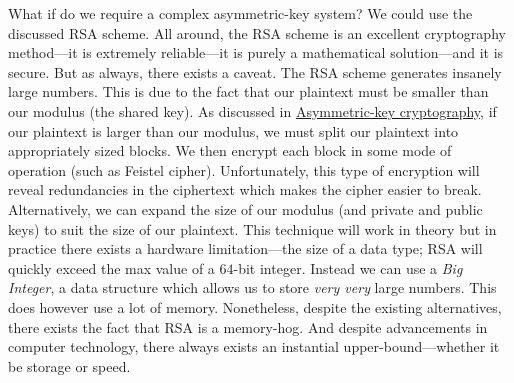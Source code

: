 What if do we require a complex asymmetric-key system? We could use the discussed RSA scheme. All around, the RSA
scheme is an excellent cryptography method---it is extremely reliable---it is purely a mathematical solution---and it is secure. 
But as always, there exists a caveat. The RSA scheme generates insanely large numbers. This is due to the fact that our plaintext
must be smaller than our modulus (the shared key). As discussed in 
\hyperref[Asymmetric-key cryptography]{Asymmetric-key cryptography}, if our plaintext is
larger than our modulus, we must split our plaintext into appropriately sized blocks. We then encrypt each block in some mode
of operation (such as Feistel cipher). Unfortunately, this type of encryption will reveal redundancies in the ciphertext which
makes the cipher easier to break. Alternatively, we can expand the size of our modulus (and private and public keys)
to suit the size of our plaintext. This technique will work in theory but in practice there exists a hardware limitation---the
size of a data type; RSA will quickly exceed the max value of a $64$-bit integer. Instead we can use a \textit{Big Integer}, a
data structure which allows us to store \textit{very very} large numbers. This does however use a lot of memory. Nonetheless,
despite the existing alternatives, there exists the fact that RSA is a memory-hog. And despite advancements in computer 
technology, there always exists an instantial upper-bound---whether it be storage or speed.
